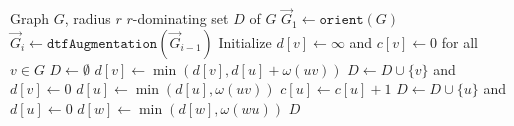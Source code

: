 \begin{algorithm}[!h]
	\begin{algorithmic}[1]
		\Require Graph $G$, radius $r$
		\Ensure $r$-dominating set $D$ of $G$
		\State $\vec G_1\leftarrow \texttt{orient}(G)$\label{algstep:dtf_start}
			\State $\vec G_i\leftarrow \texttt{dtfAugmentation}(\vec G_{i-1})$\label{algstep:dtf_end}
		\EndFor
		\State Initialize $d[v] \leftarrow \infty$ and $c[v] \leftarrow 0$ for all~$v \in G$
		\State $D\leftarrow \emptyset$
		\label{algstep:order}
				\State $d[v]\leftarrow\operatorname{min}\left(d[v], d[u]+\omega(uv)\right)$\label{algstep:pull}
			\EndFor
				\State $D\leftarrow D\cup \{v\}$ and
					   $d[v]\leftarrow 0$\label{algstep:add_to_domset}\label{algstep:D1}
				\label{algstep:pushloop}
					\State $d[u]\leftarrow \operatorname{min}\left(d[u],\omega(uv)\right)$\label{algstep:push}
					\State $c[u]\leftarrow c[u] + 1$
						\State $D\leftarrow D\cup \{u\}$ and
							   $d[u]\leftarrow 0$\label{algstep:D2}
							\State $d[w]\leftarrow \operatorname{min}\left(d[w],\omega(wu)\right)$
						\EndFor
					\EndIf
				\EndFor
			\EndIf
		\EndFor
		\State \Return $D$
	\end{algorithmic}
	\caption{$\texttt{rdomset}(G, r)$}\label{alg:r-domset}
\end{algorithm}
